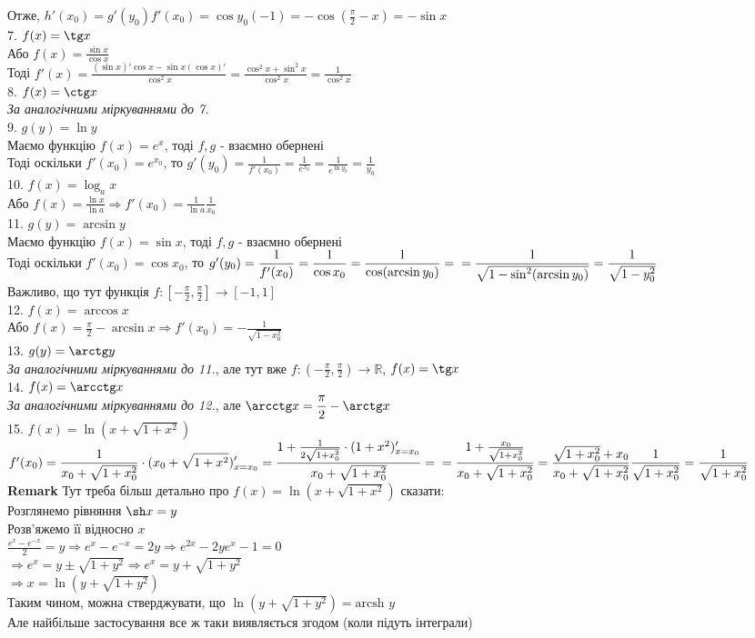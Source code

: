 \documentclass[a4paper, 14pt]{extarticle}
\def\huge{\displaystyle}
\def\bigline{\vspace{5mm}\\}
\def\rm#1{\textbf{Remark {#1}}}
\def\bigline{\vspace{5mm}\\}
\begin{document}
Отже, $h'(x_0) = g'(y_0)f'(x_0) = \cos y_0 (-1) = \huge -\cos \left(\frac{\pi}{2} - x \right) = -\sin x$
\bigline
7. $f(x) = \tg x$\\
Або $f(x) = \huge \frac{\sin x}{\cos x}$\\
Тоді $f'(x) = \huge \frac{(\sin x)' \cos x - \sin x (\cos x)'}{\cos^2 x} = \frac{\cos^2 x + \sin^2x}{\cos^2 x} = \frac{1}{\cos^2 x}$
\bigline
8. $f(x) = \ctg x$\\
\textit{За аналогічними міркуваннями до 7.}
\bigline
9. $g(y) = \ln y$\\
Маємо функцію $f(x) = e^x$, тоді $f,g$ - взаємно обернені\\
Тоді оскільки $f'(x_0) = e^{x_0}$, то $g'(y_0) = \huge \frac{1}{f'(x_0)} = \frac{1}{e^{x_0}} = \frac{1}{e^{\ln y_0}} = \frac{1}{y_0}$
\bigline
10. $f(x) = \log_a x$\\
Або $f(x) = \huge \frac{\ln x}{\ln a} \Rightarrow f'(x_0) = \frac{1}{\ln a} \frac{1}{x_0}$
\bigline
11. $g(y) = \arcsin y$\\
Маємо функцію $f(x) = \sin x$, тоді $f,g$ - взаємно обернені\\
Тоді оскільки $f'(x_0) = \cos x_0$, то $g'(y_0) = \huge \frac{1}{f'(x_0)} = \frac{1}{\cos x_0}= \frac{1}{\cos (\arcsin y_0)} = \\ = \frac{1}{\sqrt{1- \sin^2(\arcsin y_0)}} = \frac{1}{\sqrt{1-y_0^2}}$\\
Важливо, що тут функція $f: \huge \left[-\frac{\pi}{2},\frac{\pi}{2}\right] \to [-1,1]$
\bigline
12. $f(x) = \arccos x$\\
Або $f(x) = \huge \frac{\pi}{2} - \arcsin x \Rightarrow f'(x_0) = - \frac{1}{\sqrt{1-x_0^2}}$
\bigline
13. $g(y) = \arctg y$\\
\textit{За аналогічними міркуваннями до 11.}, але тут вже $f: \huge \left(-\frac{\pi}{2},\frac{\pi}{2}\right) \to \mathbb{R}$, $f(x) = \tg x$
\bigline
14. $f(x) = \arcctg x$\\
\textit{За аналогічними міркуваннями до 12.}, але $\arcctg x = \huge \frac{\pi}{2} - \arctg x$
\bigline
15. $f(x) = \ln(x + \sqrt{1+x^2})$\\
$f'(x_0) = \huge \frac{1}{x_0+ \sqrt{1+x_0^2}} \cdot (x_0+ \sqrt{1+x^2})'_{x = x_0} = \frac{1+ \frac{1}{2\sqrt{1+x_0^2}} \cdot (1+x^2)'_{x=x_0}}{x_0+ \sqrt{1+x_0^2}} = \\ = \frac{1+ \frac{x_0}{\sqrt{1+x_0^2}}}{x_0 + \sqrt{1+x_0^2}} = \frac{\sqrt{1+x_0^2}+x_0}{x_0 + \sqrt{1 + x_0^2}} \frac{1}{\sqrt{1+x_0^2}} = \frac{1}{\sqrt{1+x_0^2}}$
\bigline
\rm{} Тут треба більш детально про $f(x) = \ln(x+\sqrt{1+x^2})$ сказати:\\
Розглянемо рівняння $\sh x = y$\\
Розв'яжемо її відносно $x$\\
$\huge \frac{e^x-e^{-x}}{2} = y \Rightarrow e^x-e^{-x}=2y \Rightarrow e^{2x}- 2y e^x - 1 = 0$\\
$\Rightarrow e^x = y \pm \sqrt{1+y^2} \Rightarrow e^x = y + \sqrt{1+y^2}$\\
$\Rightarrow x = \ln(y + \sqrt{1+y^2})$\\
Таким чином, можна стверджувати, що $\ln(y+\sqrt{1+y^2}) = \textrm{arcsh } y$\\
Але найбільше застосування все ж таки виявляється згодом (коли підуть інтеграли)
\bigline
\end{document}
